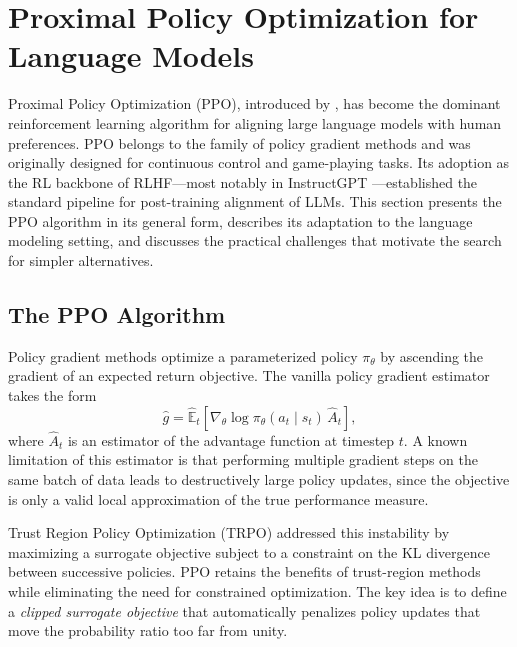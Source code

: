 \section{Proximal Policy Optimization for Language Models}
\label{sec:ppo}

Proximal Policy Optimization (PPO), introduced by \cite{schulman2017ppo}, has become the dominant reinforcement learning algorithm for aligning large language models with human preferences. PPO belongs to the family of policy gradient methods and was originally designed for continuous control and game-playing tasks. Its adoption as the RL backbone of RLHF---most notably in InstructGPT \cite{ouyang2022instructgpt}---established the standard pipeline for post-training alignment of LLMs. This section presents the PPO algorithm in its general form, describes its adaptation to the language modeling setting, and discusses the practical challenges that motivate the search for simpler alternatives.

\subsection{The PPO Algorithm}

Policy gradient methods optimize a parameterized policy $\pi_\theta$ by ascending the gradient of an expected return objective. The vanilla policy gradient estimator takes the form
\begin{equation}
    \hat{g} = \hat{\mathbb{E}}_t \left[ \nabla_\theta \log \pi_\theta(a_t \mid s_t) \, \hat{A}_t \right],
\end{equation}
where $\hat{A}_t$ is an estimator of the advantage function at timestep $t$. A known limitation of this estimator is that performing multiple gradient steps on the same batch of data leads to destructively large policy updates, since the objective is only a valid local approximation of the true performance measure.

Trust Region Policy Optimization (TRPO) addressed this instability by maximizing a surrogate objective subject to a constraint on the KL divergence between successive policies. PPO retains the benefits of trust-region methods while eliminating the need for constrained optimization. The key idea is to define a \emph{clipped surrogate objective} that automatically penalizes policy updates that move the probability ratio too far from unity.

